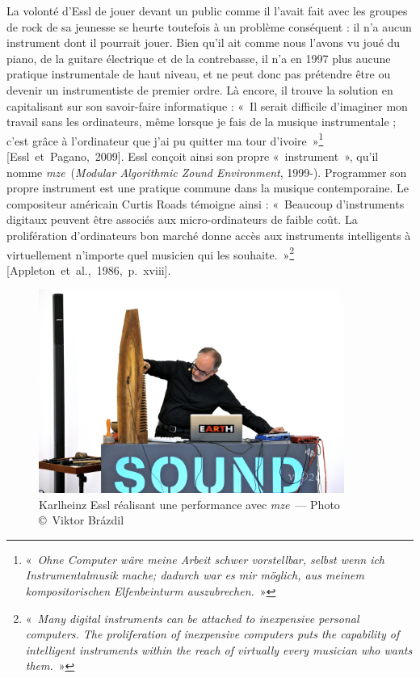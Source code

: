 \documentclass[a4paper,12pt]{article}
\newcommand{\guill}[1]{«~#1~»}
\newcommand{\maze}[0]{\emph{m\symbol{64}ze\textdegree2}}
\newcommand{\cicite}[1]{{\footnotesize[#1]}}
\begin{document}
La volonté d'Essl de jouer devant un public comme il l'avait fait avec les groupes de rock de sa jeunesse se heurte toutefois à un problème conséquent : il n'a aucun instrument dont il pourrait jouer. Bien qu'il ait comme nous l'avons vu joué du piano, de la guitare électrique et de la contrebasse, il n'a en 1997 plus aucune pratique instrumentale de haut niveau, et ne peut donc pas prétendre être ou devenir un instrumentiste de premier ordre. Là encore, il trouve la solution en capitalisant sur son savoir-faire informatique : \guill{Il serait difficile d'imaginer mon travail sans les ordinateurs, même lorsque je fais de la musique instrumentale ; c'est grâce à l'ordinateur que j'ai pu quitter ma tour d'ivoire}\footnote{\guill{\emph{Ohne Computer wäre meine Arbeit schwer vorstellbar, selbst wenn ich Instrumentalmusik mache\!; dadurch war es mir möglich, aus meinem kompositorischen Elfenbeinturm auszubrechen.}}} \cicite{Essl~et~Pagano,~2009}. Essl conçoit ainsi son propre \guill{instrument}, qu'il nomme \maze~(\emph{Modular Algorithmic Zound Environment}, 1999-). Programmer son propre instrument est une pratique commune dans la musique contemporaine. Le compositeur américain Curtis Roads témoigne ainsi : \guill{Beaucoup d'instruments digitaux peuvent être associés aux micro-ordinateurs de faible coût. La prolifération d'ordinateurs bon marché donne accès aux instruments intelligents à virtuellement n'importe quel musicien qui les souhaite.}\footnote{\guill{\emph{Many digital instruments can be attached to inexpensive personal computers. The proliferation of inexpensive computers puts the capability of intelligent instruments within the reach of virtually every musician who wants them.}}} \cicite{Appleton~et~al.,~1986,~p.~xviii}.

\begin{figure}[!h]
\begin{center}
\includegraphics[width=10cm]{images/performance.jpg}
\caption{\footnotesize Karlheinz Essl réalisant une performance avec \maze~--- Photo \copyright~Viktor Br\'azdil}
\label{performancephoto}
\end{center}
\end{figure}
\end{document}
